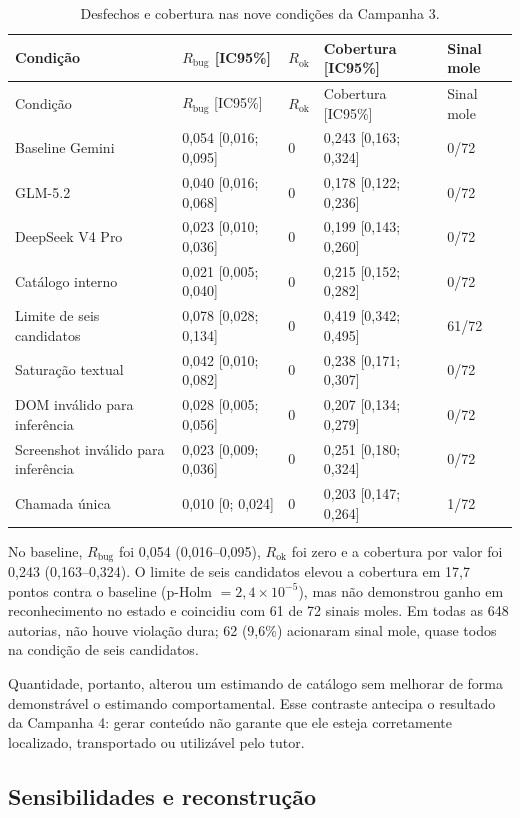 \documentclass[11pt,a4paper]{article}
\newcommand{\Rbug}{\ensuremath{R_{\mathrm{bug}}}}
\newcommand{\Rok}{\ensuremath{R_{\mathrm{ok}}}}
\begin{document}
\begingroup
\footnotesize
\setlength{\tabcolsep}{3pt}
\begin{longtable}{@{}P{4.2cm}C{2.5cm}C{1.4cm}C{2.6cm}C{2.5cm}@{}}
\caption{Desfechos e cobertura nas nove condições da Campanha 3.}\label{tab:s-c3-arms}\\
\toprule
Condição & \Rbug{} [IC95\%] & \Rok{} & Cobertura [IC95\%] & Sinal mole \\
\midrule
\endfirsthead
\toprule
Condição & \Rbug{} [IC95\%] & \Rok{} & Cobertura [IC95\%] & Sinal mole \\
\midrule
\endhead
Baseline Gemini & 0,054 [0,016; 0,095] & 0 & 0,243 [0,163; 0,324] & 0/72 \\
GLM-5.2 & 0,040 [0,016; 0,068] & 0 & 0,178 [0,122; 0,236] & 0/72 \\
DeepSeek V4 Pro & 0,023 [0,010; 0,036] & 0 & 0,199 [0,143; 0,260] & 0/72 \\
Catálogo interno & 0,021 [0,005; 0,040] & 0 & 0,215 [0,152; 0,282] & 0/72 \\
Limite de seis candidatos & 0,078 [0,028; 0,134] & 0 & 0,419 [0,342; 0,495] & 61/72 \\
Saturação textual & 0,042 [0,010; 0,082] & 0 & 0,238 [0,171; 0,307] & 0/72 \\
DOM inválido para inferência & 0,028 [0,005; 0,056] & 0 & 0,207 [0,134; 0,279] & 0/72 \\
Screenshot inválido para inferência & 0,023 [0,009; 0,036] & 0 & 0,251 [0,180; 0,324] & 0/72 \\
Chamada única & 0,010 [0; 0,024] & 0 & 0,203 [0,147; 0,264] & 1/72 \\
\bottomrule
\end{longtable}
\endgroup

No baseline, \Rbug{} foi 0,054 (0,016--0,095), \Rok{} foi zero e a cobertura por valor foi 0,243 (0,163--0,324). O limite de seis candidatos elevou a cobertura em 17,7 pontos contra o baseline (p-Holm $=2,4\times10^{-5}$), mas não demonstrou ganho em reconhecimento no estado e coincidiu com 61 de 72 sinais moles. Em todas as 648 autorias, não houve violação dura; 62 (9,6\%) acionaram sinal mole, quase todos na condição de seis candidatos.

Quantidade, portanto, alterou um estimando de catálogo sem melhorar de forma demonstrável o estimando comportamental. Esse contraste antecipa o resultado da Campanha 4: gerar conteúdo não garante que ele esteja corretamente localizado, transportado ou utilizável pelo tutor.

\subsection{Sensibilidades e reconstrução}
\end{document}
